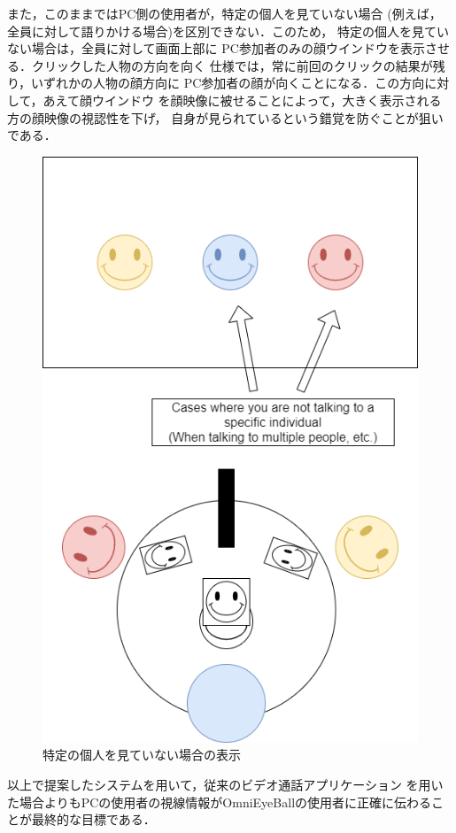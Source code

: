また，このままではPC側の使用者が，特定の個人を見ていない場合
(例えば，全員に対して語りかける場合)を区別できない．このため，
特定の個人を見ていない場合は，全員に対して画面上部に
PC参加者のみの顔ウインドウを表示させる．クリックした人物の方向を向く
仕様では，常に前回のクリックの結果が残り，いずれかの人物の顔方向に
PC参加者の顔が向くことになる．この方向に対して，あえて顔ウインドウ
を顔映像に被せることによって，大きく表示される方の顔映像の視認性を下げ，
自身が見られているという錯覚を防ぐことが狙いである．

\begin{figure}[tbp]
  \centering
  \includegraphics[scale=0.6]{fig/SPcase.png}
  \caption{特定の個人を見ていない場合の表示}\label{OEBGUI2}
\end{figure}

以上で提案したシステムを用いて，従来のビデオ通話アプリケーション
を用いた場合よりもPCの使用者の視線情報がOmniEyeBallの使用者に正確に伝わることが最終的な目標である．
